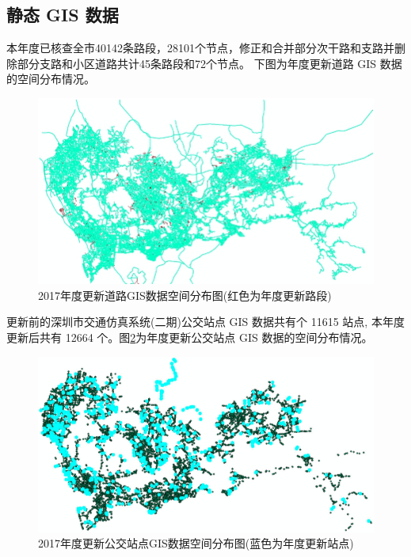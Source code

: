 \subsection{静态 GIS 数据}
本年度已核查全市40142条路段，28101个节点，修正和合并部分次干路和支路并删除部分支路和小区道路共计45条路段和72个节点。
下图为年度更新道路 GIS 数据的空间分布情况。

\begin{figure}[ht]
  \centering
  \includegraphics[width=\textwidth]{figures/chp02_2017年度更新道路GIS数据空间分布图.jpg}
  \caption[2017年度更新道路GIS数据空间分布图]{2017年度更新道路GIS数据空间分布图(红色为年度更新路段)\label{fig:2017年度更新道路GIS数据空间分布图}}
\end{figure}

更新前的深圳市交通仿真系统(二期)公交站点 GIS 数据共有个 11615 站点,
本年度更新后共有 12664 个。图\ref{fig:2017年度更新公交站点GIS数据空间分布图}为年度更新公交站点 GIS 数据的空间分布情况。

\begin{figure}[ht]
  \centering
  \includegraphics[width=\textwidth]{figures/chp02_2017年度更新公交站点GIS数据空间分布图.jpg}
  \caption[2017年度更新公交站点GIS数据空间分布图]{2017年度更新公交站点GIS数据空间分布图(蓝色为年度更新站点)\label{fig:2017年度更新公交站点GIS数据空间分布图}}
\end{figure}

